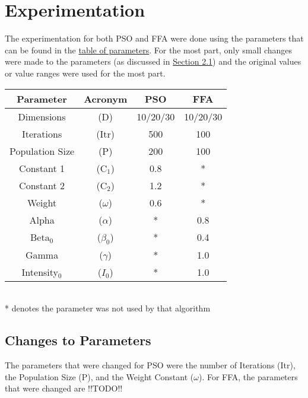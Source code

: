 \documentclass[paper=a4, fontsize=11pt]{scrartcl} %
\numberwithin{equation}{section} %
\numberwithin{figure}{section} %
\numberwithin{table}{section} %
\begin{document}
			
\section{Experimentation}\label{S2}
	The experimentation for both PSO and FFA were done using the parameters that can be found in the \hyperref[T21]{table of parameters}. For the most part, only small changes were made to the parameters (as discussed in \hyperref[S21]{Section 2.1}) and the original values or value ranges were used for the most part.
	
	\begin{minipage}{\linewidth}
		\centering
		\begin{tabular}{cc|cc}\label{T21}
			Parameter       			& Acronym 		& PSO 		& FFA  		\\
			\hline
			Dimensions					& (D)			& 10/20/30	& 10/20/30	\\
			Iterations					& (Itr)			& 500		& 100  		\\
			Population Size				& (P)			& 200		& 100  		\\
			Constant 1					& (C$_1$)		& 0.8		& *    		\\
			Constant 2					& (C$_2$)		& 1.2		& *			\\
			Weight						& ($\omega$)	& 0.6		& *			\\
			Alpha						& ($\alpha$)	& *			& 0.8		\\
			Beta$_0$					& ($\beta_0$)	& *			& 0.4		\\
			Gamma						& ($\gamma$)	& *			& 1.0		\\
			Intensity$_0$ 				& ($I_0$)		& *			& 1.0		\\
		\end{tabular}
		\bigskip\\
		\small{* denotes the parameter was not used by that algorithm}
	\end{minipage}
	
	\subsection{Changes to Parameters}\label{S21}
	 The parameters that were changed for PSO were the number of Iterations (Itr), the Population Size (P), and the Weight Constant ($\omega$). For FFA, the parameters that were changed are !!TODO!!\\
	 
\end{document}

